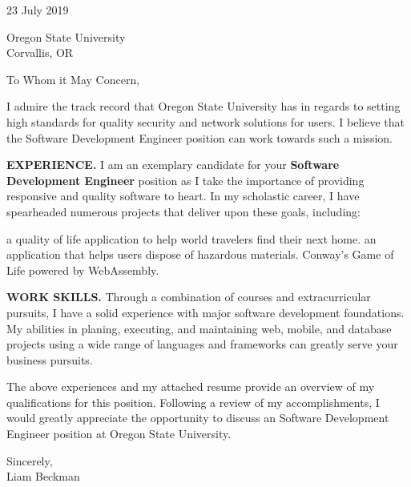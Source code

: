 



\textcolor{my-grey}{\dotfill}
\bigbreak


23 July 2019\\
\bigbreak

Oregon State University\\
Corvallis, OR

\bigbreak

To Whom it May Concern,

\bigbreak

I admire the track record that Oregon State University has in regards to setting high standards for quality security and network solutions for users. I believe that the Software Development Engineer position can work towards such a mission.

\bigbreak

\textbf{EXPERIENCE.} I am an exemplary candidate for your \textbf{Software Development Engineer} position as I take the importance of providing responsive and quality software to heart. In my scholastic career, I have spearheaded numerous projects that deliver upon these goals, including:

\begin{itemize}[label=$\triangleright$]
    a quality of life application to help world travelers find their next home.
    an application that helps users dispose of hazardous materials.
    Conway's Game of Life powered by WebAssembly.
\end{itemize}

\bigbreak

\textbf{WORK SKILLS.} Through a combination of courses and extracurricular pursuits, I have a solid experience with major software development foundations. My abilities in planing, executing, and maintaining web, mobile, and database projects using a wide range of languages and frameworks can greatly serve your business pursuits.

\bigbreak

The above experiences and my attached resume provide an overview of my qualifications for this position. Following a review of my accomplishments, I would greatly appreciate the opportunity to discuss an Software Development Engineer position at Oregon State University.

\bigbreak

Sincerely,\\

Liam Beckman

\vfill

\textcolor{my-grey}{\dotfill}
\medbreak



